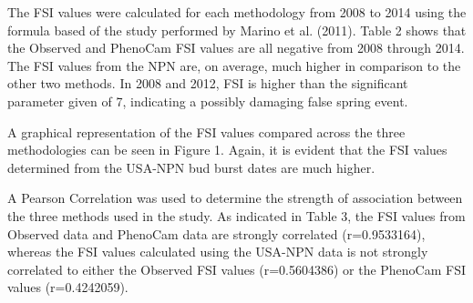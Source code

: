 \documentclass{article}
\begin{document}
The FSI values were calculated for each methodology from 2008 to 2014 using the formula based of the study performed by Marino et al. (2011). Table 2 shows that the Observed and PhenoCam FSI values are all negative from 2008 through 2014. The FSI values from the NPN are, on average, much higher in comparison to the other two methods. In 2008 and 2012, FSI is higher than the significant parameter given of 7, indicating a possibly damaging false spring event. 

A graphical representation of the FSI values compared across the three methodologies can be seen in Figure 1.  Again, it is evident that the FSI values determined from the USA-NPN bud burst dates are much higher.


A Pearson Correlation was used to determine the strength of association between the three methods used in the study. As indicated in Table 3, the FSI values from Observed data and PhenoCam data are strongly correlated (r=0.9533164), whereas the FSI values calculated using the USA-NPN data is not strongly correlated to either the Observed FSI values (r=0.5604386) or the PhenoCam FSI values (r=0.4242059).



\end{document}
